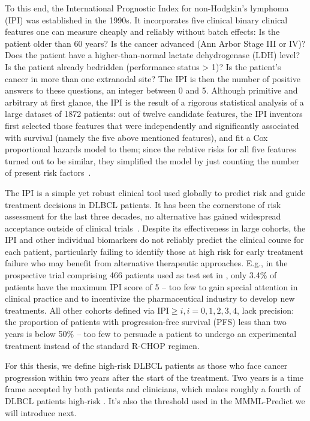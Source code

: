 To this end, the International Prognostic Index for non-Hodgkin's lymphoma (IPI) was established in the 
1990s. It incorporates five clinical binary clinical features one can measure cheaply and reliably without batch 
effects: Is the patient older than 60 years? Is the cancer advanced (Ann Arbor Stage III or IV)? Does 
the patient have a higher-than-normal lactate dehydrogenase (LDH) level? Is the patient already 
bedridden (performance status > 1)? Is the patient's cancer in more than one extranodal site? The 
IPI is then the number of positive answers to these questions, an integer between 0 and 5. Although 
primitive and arbitrary at first glance, the IPI is the result of a rigorous statistical analysis 
of a large dataset of \num{1872} patients: out of twelve candidate features, the IPI inventors
first selected those features that were independently and significantly associated with survival 
(namely the five above mentioned features), and fit a Cox proportional hazards model to them;
since the relative risks for all five features turned out to be similar, they simplified the model 
by just counting the number of present risk factors~\cite{ipi93}. 

The IPI is a simple yet robust clinical tool used globally to predict risk and guide 
treatment decisions in DLBCL patients. It has been the cornerstone of risk assessment for the last 
three decades, no alternative has gained widespread acceptance outside of clinical 
trials~\citep{ipi-stay-strong}. 
Despite its effectiveness in large cohorts, the IPI and other individual 
biomarkers do not reliably predict the clinical course for each patient, particularly failing to 
identify those at high risk for early treatment failure who may benefit from alternative therapeutic 
approaches. E.g., in the prospective trial comprising \num{466} patients used as test set in 
\citep{staiger20}, only \num{3.4}\% of patients have the maximum IPI score of 5 -- too few
to gain special attention in clinical practice and to incentivize the pharmaceutical industry to 
develop new treatments. All other cohorts defined via $\text{IPI} \geq i, i = 0, 1, 2, 3, 4$, lack 
precision: the proportion of patients with progression-free survival (PFS) less than two years is below 
\num{50}\% -- too few to persuade a patient to undergo an experimental treatment instead of the 
standard R-CHOP regimen.

For this thesis, we define high-risk DLBCL patients as those who face cancer progression 
within two years after the start of the treatment. Two years is a time frame accepted by both 
patients and clinicians, which makes roughly a fourth of DLBCL patients high-risk \cite{staiger20}.
It's also the threshold used in the MMML-Predict we will introduce next.


